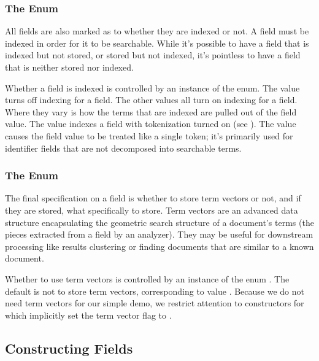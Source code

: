 \subsubsection{The  Enum}

All fields are also marked as to whether they are indexed or not.  A
field must be indexed in order for it to be searchable.  While it's
possible to have a field that is indexed but not stored, or stored but
not indexed, it's pointless to have a field that is neither stored nor
indexed.

Whether a field is indexed is controlled by an instance of the
 enum.  The value  turns off indexing
for a field.  The other values all turn on indexing for a field.
Where they vary is how the terms that are indexed are pulled out of
the field value.  The value  indexes a field with
tokenization turned on (see ).  The value
 causes the field value to be treated like a
single token; it's primarily used for identifier fields that are not
decomposed into searchable terms.

\subsubsection{The  Enum}

The final specification on a field is whether to store term vectors or
not, and if they are stored, what specifically to store.  Term vectors
are an advanced data structure encapsulating the geometric search
structure of a document's terms (the pieces extracted from a field by
an analyzer).  They may be useful for downstream processing like
results clustering or finding documents that are similar to a known
document.

Whether to use term vectors is controlled by an instance of the enum
.  The default is not to store term vectors,
corresponding to value .  Because we do not need
term vectors for our simple demo, we restrict attention to
constructors for  which implicitly set the term vector
flag to .


\subsection{Constructing Fields}

